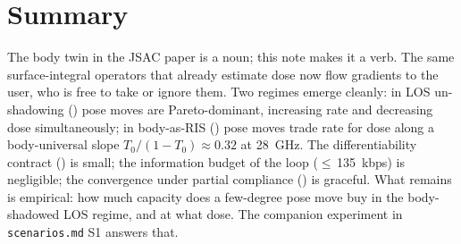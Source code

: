 \documentclass[11pt,a4paper]{article}
\theoremstyle{definition}
\begin{document}
\section{Summary}\label{sec:sum}

The body twin in the JSAC paper is a noun; this note makes it a
verb.  The same surface-integral operators that already estimate
dose now flow gradients to the user, who is free to take or ignore
them.  Two regimes emerge cleanly: in LOS un-shadowing
() pose moves are Pareto-dominant, increasing
rate and decreasing dose simultaneously; in body-as-RIS
() pose moves trade rate for dose along a
body-universal slope $T_0/(1-T_0)\approx 0.32$ at \SI{28}{GHz}.
The differentiability contract () is small; the
information budget of the loop ($\le$\,\SI{135}{kbps}) is
negligible; the convergence under partial compliance
() is graceful.  What remains is empirical: how
much capacity does a few-degree pose move buy in the body-shadowed
LOS regime, and at what dose.  The companion experiment in
\texttt{scenarios.md} S1 answers that.
\end{document}
